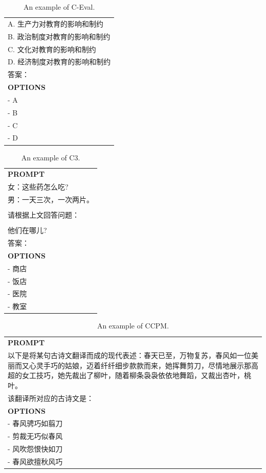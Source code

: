 \begin{table}[h]
\begin{tabular}{p{12cm}}
\\A. 生产力对教育的影响和制约
\\B. 政治制度对教育的影响和制约
\\C. 文化对教育的影响和制约
\\D. 经济制度对教育的影响和制约
\\答案：\\
\midrule
\textbf{OPTIONS}\\
- A\\
- B\\
- C\\
- D\\
\bottomrule
\end{tabular}
    \caption{\centering An example of C-Eval.}
    \label{tab:ceval_eval_format_example}
\end{table}

\begin{table}[h]
    \centering \small
\begin{tabular}{p{12cm}}
\toprule
\textbf{PROMPT}\\
女：这些药怎么吃?
\\男：一天三次，一次两片。
\\
\\请根据上文回答问题：
\\
\\他们在哪儿?
\\答案：\\
\midrule
\textbf{OPTIONS}\\
- 商店\\
- 饭店\\
- 医院\\
- 教室\\
\bottomrule
\end{tabular}
    \caption{\centering An example of C3.}
    \label{tab:c3_eval_format_example}
\end{table}

\begin{table}[h]
    \centering \small
\begin{tabular}{p{12cm}}
\toprule
\textbf{PROMPT}\\
以下是将某句古诗文翻译而成的现代表述：春天已至，万物复苏，春风如一位美丽而又心灵手巧的姑娘，迈着纤纤细步款款而来，她挥舞剪刀，尽情地展示那高超的女工技巧，她先裁出了柳叶，随着柳条袅袅依依地舞蹈，又裁出杏叶，桃叶。
\\该翻译所对应的古诗文是：\\
\midrule
\textbf{OPTIONS}\\
- 春风骋巧如翦刀\\
- 剪裁无巧似春风\\
- 风吹怨恨快如刀\\
- 春风欲擅秋风巧\\
\bottomrule
\end{tabular}
    \caption{\centering An example of CCPM.}
    \label{tab:ccpm_eval_format_example}
\end{table}

